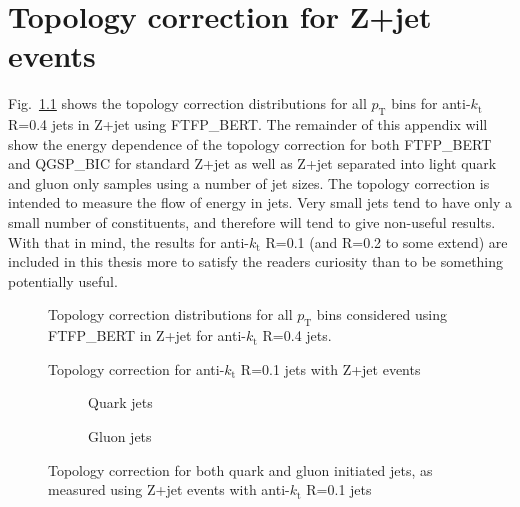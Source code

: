 \chapter{ Topology correction for Z+jet events}
Fig.~\ref{plot:ZJetTopoDists4App} shows the topology correction distributions for all $p_{\mathrm T}$ bins for anti-$k_{\mathrm t}$ R=0.4 jets in Z+jet using FTFP\_BERT.  
The remainder of this appendix will show the energy dependence of the topology correction for both FTFP\_BERT and QGSP\_BIC for standard Z+jet as well as Z+jet separated into light quark and gluon only samples using a number of jet sizes.  
The topology correction is intended to measure the flow of energy in jets.
Very small jets tend to have only a small number of constituents, and therefore will tend to give non-useful results.
With that in mind, the results for anti-$k_{\mathrm t}$ R=0.1 (and R=0.2 to some extend) are included in this thesis more to satisfy the readers curiosity than to be something potentially useful.


\begin{figure}[!ht]
 \centering
 \caption[Topology correction distributions, anti-$k_{\mathrm t}$ R=0.4 with FTFP\_BERT]
 {\small Topology correction distributions for all $p_{\mathrm T}$ bins considered using FTFP\_BERT in Z+jet for anti-$k_{\mathrm t}$ R=0.4 jets.  } 
 \label{plot:ZJetTopoDists4App}
\end{figure}
\clearpage

\begin{figure}[!ht]
 \centering
 \caption[Topology correction for anti-$k_{\mathrm t}$ R=0.1 jets with Z+jet events]
 {\small Topology correction for anti-$k_{\mathrm t}$ R=0.1 jets with Z+jet events}
 \label{plot:ZJetTopo1App}
\end{figure}

\begin{figure}[!ht]
 \centering
 \begin{subfigure}{.5\textwidth}
  \centering
  \caption{Quark jets}
 \end{subfigure}%
 \begin{subfigure}{.5\textwidth}
  \centering
  \caption{Gluon jets}
 \end{subfigure}
 \caption[Quark/gluon jet topology correction, anti-$k_{\mathrm t}$ R=0.1, Z+jet]
 {\small Topology correction for both quark and gluon initiated jets, as measured using Z+jet events with anti-$k_{\mathrm t}$ R=0.1 jets}
 \label{plot:ZJetTopoCorrFlav1App}
\end{figure}

